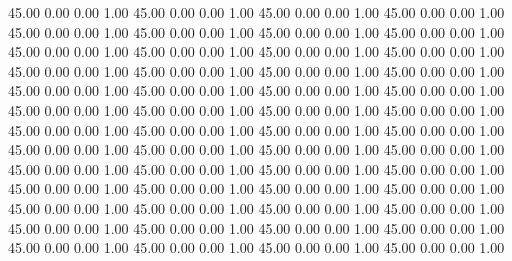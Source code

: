    45.00   0.00   0.00   1.00
   45.00   0.00   0.00   1.00
   45.00   0.00   0.00   1.00
   45.00   0.00   0.00   1.00
   45.00   0.00   0.00   1.00
   45.00   0.00   0.00   1.00
   45.00   0.00   0.00   1.00
   45.00   0.00   0.00   1.00
   45.00   0.00   0.00   1.00
   45.00   0.00   0.00   1.00
   45.00   0.00   0.00   1.00
   45.00   0.00   0.00   1.00
   45.00   0.00   0.00   1.00
   45.00   0.00   0.00   1.00
   45.00   0.00   0.00   1.00
   45.00   0.00   0.00   1.00
   45.00   0.00   0.00   1.00
   45.00   0.00   0.00   1.00
   45.00   0.00   0.00   1.00
   45.00   0.00   0.00   1.00
   45.00   0.00   0.00   1.00
   45.00   0.00   0.00   1.00
   45.00   0.00   0.00   1.00
   45.00   0.00   0.00   1.00
   45.00   0.00   0.00   1.00
   45.00   0.00   0.00   1.00
   45.00   0.00   0.00   1.00
   45.00   0.00   0.00   1.00
   45.00   0.00   0.00   1.00
   45.00   0.00   0.00   1.00
   45.00   0.00   0.00   1.00
   45.00   0.00   0.00   1.00
   45.00   0.00   0.00   1.00
   45.00   0.00   0.00   1.00
   45.00   0.00   0.00   1.00
   45.00   0.00   0.00   1.00
   45.00   0.00   0.00   1.00
   45.00   0.00   0.00   1.00
   45.00   0.00   0.00   1.00
   45.00   0.00   0.00   1.00
   45.00   0.00   0.00   1.00
   45.00   0.00   0.00   1.00
   45.00   0.00   0.00   1.00
   45.00   0.00   0.00   1.00
   45.00   0.00   0.00   1.00
   45.00   0.00   0.00   1.00
   45.00   0.00   0.00   1.00
   45.00   0.00   0.00   1.00
   45.00   0.00   0.00   1.00
   45.00   0.00   0.00   1.00
   45.00   0.00   0.00   1.00
   45.00   0.00   0.00   1.00
